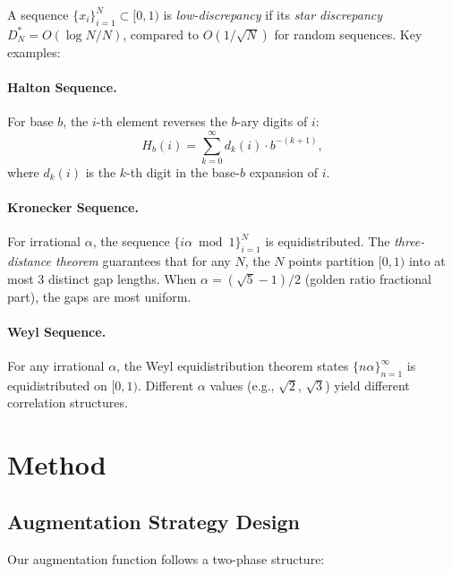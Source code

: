 \documentclass[11pt,a4paper]{article}
\begin{document}
A sequence $\{x_i\}_{i=1}^N \subset [0,1)$ is \emph{low-discrepancy} if its
\emph{star discrepancy} $D_N^* = O(\log N / N)$, compared to $O(1/\sqrt{N})$
for random sequences. Key examples:

\paragraph{Halton Sequence.} For base $b$, the $i$-th element reverses the
$b$-ary digits of $i$:
\begin{equation}
  H_b(i) = \sum_{k=0}^{\infty} d_k(i) \cdot b^{-(k+1)},
  \label{eq:halton}
\end{equation}
where $d_k(i)$ is the $k$-th digit in the base-$b$ expansion of $i$.

\paragraph{Kronecker Sequence.} For irrational $\alpha$, the sequence
$\{i\alpha \bmod 1\}_{i=1}^N$ is equidistributed. The \emph{three-distance
theorem} guarantees that for any $N$, the $N$ points partition $[0,1)$ into at
most 3 distinct gap lengths. When $\alpha = (\sqrt{5}-1)/2$ (golden ratio
fractional part), the gaps are most uniform.

\paragraph{Weyl Sequence.} For any irrational $\alpha$, the Weyl
equidistribution theorem states $\{n\alpha\}_{n=1}^\infty$ is equidistributed
on $[0,1)$. Different $\alpha$ values (e.g., $\sqrt{2}$, $\sqrt{3}$) yield
different correlation structures.

\section{Method}
\label{sec:method}

\subsection{Augmentation Strategy Design}

Our augmentation function follows a two-phase structure:
\end{document}
